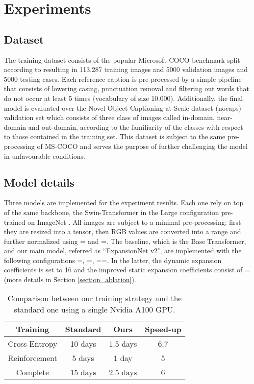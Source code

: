 
\section{Experiments}

\subsection{Dataset}

The training dataset consists of the popular Microsoft COCO benchmark \cite{lin2014microsoft} split according to \cite{karpathy2015deep} resulting in 113.287 training images and 5000 validation images and 5000 testing cases. Each reference caption is pre-processed by a simple pipeline that consists of lowering casing, punctuation removal and filtering out words that do not occur at least 5 times (vocabulary of size 10.000). Additionally, the final model is evaluated over the Novel Object Captioning at Scale dataset (nocaps) validation set \cite{agrawal2019nocaps} which consists of three class of images called in-domain, near-domain and out-domain, according to the familiarity of the classes with respect to those contained in the training set. This dataset is subject to the same pre-processing of MS-COCO and serves the purpose of further challenging the model in unfavourable conditions.
 

\subsection{Model details}

Three models are implemented for the experiment results. Each one rely on top of the same backbone, the Swin-Transformer in the Large configuration \cite{liu2021swin} pre-trained on ImageNet \cite{deng2009imagenet}. All images are subject to a minimal pre-processing: first they are resized into a  tensor, then RGB values are converted into a  range and further normalized using = and =. The baseline, which is the Base Transformer, and our main model, referred as ``ExpansionNet v2", are implemented with the following configurations =, =, ==. In the latter, the dynamic expansion coefficients is set to 16 and the improved static expansion coefficients consist of = (more details in Section \ref{section_ablation}).

\begin{table}[ht]
\caption{Comparison between our training strategy and the standard one using a single Nvidia A100 GPU.}
\center
\footnotesize
\vspace{-12.0pt}
\begin{tabular}{| c | c | c | c |} 
 \hline
 Training & Standard & Ours & Speed-up \\
 \hline
 Cross-Entropy & 10 days & 1.5 days & 6.7  \\
 \hline
 Reinforcement & 5 days & 1 day & 5 \\
 \hline
 Complete & 15 days & 2.5 days & 6 \\
 \hline
 \end{tabular}
  \label{tab:train_speed_gpu}
\end{table}



